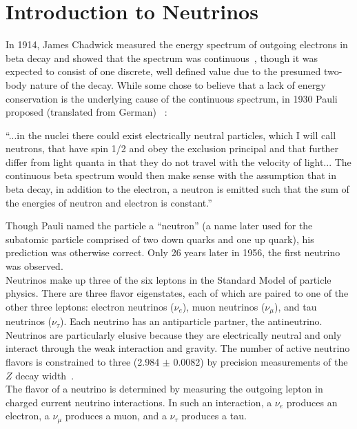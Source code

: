 \section{Introduction to Neutrinos}
In 1914, James Chadwick measured the energy spectrum of outgoing electrons in beta decay and showed that the spectrum was continuous~\cite{ChadwickSource}, though it was expected to consist of one discrete, well defined value due to the presumed two-body nature of the decay. While some chose to believe that a lack of energy conservation is the underlying cause of the continuous spectrum, in 1930 Pauli proposed (translated from German) ~\cite{PauliLetter}:
\begin{displayquote}
``...in the nuclei there could exist electrically neutral particles, which I will call neutrons, that have spin 1/2 and obey the exclusion principal and that further differ from light quanta in that they do not travel with the velocity of light... The continuous beta spectrum would then make sense with the assumption that in beta decay, in addition to the electron, a neutron is emitted such that the sum of the energies of neutron and electron is constant.''
\end{displayquote}
Though Pauli named the particle a ``neutron'' (a name later used for the subatomic particle comprised of two down quarks and one up quark), his prediction was otherwise correct. Only 26 years later in 1956, the first neutrino was observed.\\

Neutrinos make up three of the six leptons in the Standard Model of particle physics. There are three flavor eigenstates, each of which are paired to one of the other three leptons: electron neutrinos ($\nu_e$), muon neutrinos ($\nu_\mu$), and tau neutrinos ($\nu_\tau$). Each neutrino has an antiparticle partner, the antineutrino. Neutrinos are particularly elusive because they are electrically neutral and only interact through the weak interaction and gravity. The number of active neutrino flavors is constrained to three (2.984 $\pm$ 0.0082) by precision measurements of the $Z$ decay width~\cite{ZDecayWidthsource}. \\

The flavor of a neutrino is determined by measuring the outgoing lepton in charged current neutrino interactions. In such an interaction, a $\nu_e$ produces an electron, a $\nu_\mu$ produces a muon, and a $\nu_\tau$ produces a tau.\\

